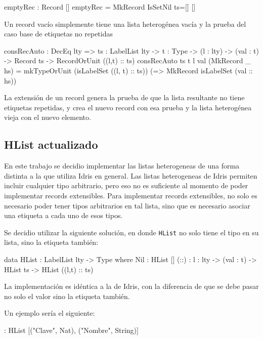 \begin{code}
emptyRec : Record []
emptyRec = MkRecord IsSetNil {ts=[]} [] 
\end{code}

Un record vacío simplemente tiene una lista heterogénea vacía y la prueba del caso base de etiquetas no repetidas

\begin{code}
consRecAuto : DecEq lty => {ts : LabelList lty} -> 
  {t : Type} -> (l : lty) -> (val : t) -> Record ts -> 
  RecordOrUnit ((l,t) :: ts)
consRecAuto {ts} {t} l val (MkRecord _ hs) = 
  mkTypeOrUnit (isLabelSet ((l, t) :: ts)) 
  (\isLabelSet => MkRecord isLabelSet (val :: hs))
\end{code}

La extensión de un record genera la prueba de que la lista resultante no tiene etiquetas repetidas, y crea el nuevo record con esa prueba y la lista heterogénea vieja con el nuevo elemento.

\subsection{HList actualizado}

En este trabajo se decidio implementar las listas heterogeneas de una forma distinta a la que utiliza Idris en general. Las listas heterogeneas de Idris permiten incluir cualquier tipo arbitrario, pero eso no es suficiente al momento de poder implementar records extensibles. Para implementar records extensibles, no solo es necesario poder tener tipos arbitrarios en tal lista, sino que es necesario asociar una etiqueta a cada uno de esos tipos.

Se decidio utilizar la siguiente solución, en donde \texttt{HList} no solo tiene el tipo en su lista, sino la etiqueta también:

\begin{code}
data HList : LabelList lty -> Type where
  Nil : HList []
  (::) : {l : lty} -> (val : t) -> HList ts -> 
    HList ((l,t) :: ts)
\end{code}

La implementación es idéntica a la de Idris, con la diferencia de que se debe pasar no solo el valor sino la etiqueta también.

Un ejemplo sería el siguiente:

\begin{code}
 : 
  HList [("Clave", Nat), ("Nombre", String)]
\end{code}


